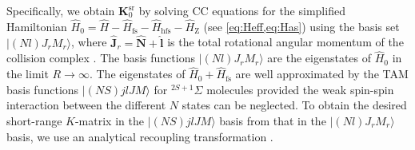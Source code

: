 \documentclass[reprint,amssymb,noeprint,twocolumn,longbibliography]{revtex4-2}
\begin{document}
Specifically, we obtain $\bm{K}^\mathrm{sr}_0$ by solving CC equations for the simplified Hamiltonian  $\hat{H}_0 = \hat{H} - \hat{H}_\text{fs} - \hat{H}_\text{hfs}-\hat{H}_\text{Z}$ (see \cref{eq:Heff,eq:Has})   
using the basis set $|(Nl)J_rM_{r}\rangle$, where $\hat{\mathbf{J}}_r=\hat{\mathbf{N}} + \hat{\mathbf{l}}$  is the total rotational angular momentum of the collision complex \cite{Tscherbul_23}.
The basis functions $|(Nl)J_rM_{r}\rangle$ are the eigenstates of $\hat{H}_\mathrm{0}$ in the limit $R\to \infty$. The eigenstates   
of $\hat{H}_\mathrm{0}+\hat{H}_\text{fs}$ are well approximated by the TAM basis functions $|(NS)jlJM\rangle$ for $^{2S+1}\Sigma$ molecules \cite{Corey_83} provided the weak spin-spin interaction between the different $N$ states can be neglected.
 To obtain the desired short-range $K$-matrix in
  the $|(NS)jlJM\rangle$ basis from that in the  $|(Nl)J_rM_r\rangle$ basis, we use an analytical recoupling transformation \cite{Corey_83,SM}.
\end{document}
